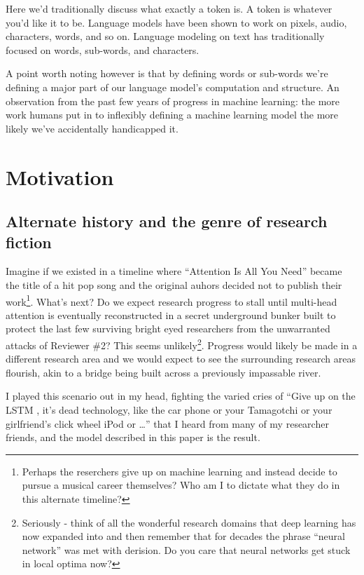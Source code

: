 \documentclass{article}
\begin{document}
Here we'd traditionally discuss what exactly a token is.
A token is whatever you'd like it to be.
Language models have been shown to work on pixels, audio, characters, words, and so on.
Language modeling on text has traditionally focused on words, sub-words, and characters.

A point worth noting however is that by defining words or sub-words we're defining a major part of our language model's computation and structure.
An observation from the past few years of progress in machine learning: the more work humans put in to inflexibly defining a machine learning model the more likely we've accidentally handicapped it.



\section{Motivation}

\subsection{Alternate history and the genre of research fiction}

Imagine if we existed in a timeline where ``Attention Is All You Need'' \cite{vaswani2017attention} became the title of a hit pop song and the original auhors decided not to publish their work\footnote{Perhaps the reserchers give up on machine learning and instead decide to pursue a musical career themselves? Who am I to dictate what they do in this alternate timeline?
}.
What's next?
Do we expect research progress to stall until multi-head attention is eventually reconstructed in a secret underground bunker built to protect the last few surviving bright eyed researchers from the unwarranted attacks of Reviewer \#2?
This seems unlikely\footnote{Seriously - think of all the wonderful research domains that deep learning has now expanded into and then remember that for decades the phrase ``neural network'' was met with derision. Do you care that neural networks get stuck in local optima now?}.
Progress would likely be made in a different research area and we would expect to see the surrounding research areas flourish, akin to a bridge being built across a previously impassable river.

I played this scenario out in my head, fighting the varied cries of ``Give up on the LSTM \cite{Hochreiter1997LongSM}, it's dead technology, like the car phone or your Tamagotchi or your girlfriend's click wheel iPod or \ldots'' that I heard from many of my researcher friends, and the model described in this paper is the result.
\end{document}
